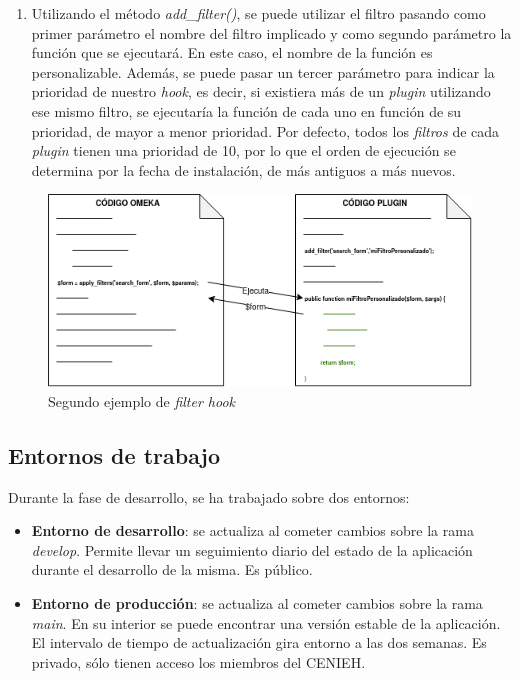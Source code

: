 \documentclass[
]{article}
\providecommand{\tightlist}{%
  \setlength{\itemsep}{0pt}\setlength{\parskip}{0pt}}
\begin{document}
\begin{enumerate}
\def\labelenumi{\arabic{enumi}.}
\setcounter{enumi}{1}
\tightlist
\item
  Utilizando el método \emph{add\_filter()}, se puede utilizar el filtro
  pasando como primer parámetro el nombre del filtro implicado y como
  segundo parámetro la función que se ejecutará. En este caso, el nombre
  de la función es personalizable. Además, se puede pasar un tercer
  parámetro para indicar la prioridad de nuestro \emph{hook}, es decir,
  si existiera más de un \emph{plugin} utilizando ese mismo filtro, se
  ejecutaría la función de cada uno en función de su prioridad, de mayor
  a menor prioridad. Por defecto, todos los \emph{filtros} de cada
  \emph{plugin} tienen una prioridad de 10, por lo que el orden de
  ejecución se determina por la fecha de instalación, de más antiguos a
  más nuevos.
\end{enumerate}

\begin{figure}
\hypertarget{filterhooksB}{%
\centering
\includegraphics{../_static/images/filterhooksB.png}
\caption{Segundo ejemplo de \emph{filter hook}}\label{filterhooksB}
}
\end{figure}

\hypertarget{entornos-de-trabajo}{%
\subsection{Entornos de trabajo}\label{entornos-de-trabajo}}

Durante la fase de desarrollo, se ha trabajado sobre dos entornos:

\begin{itemize}
\tightlist
\item
  \textbf{Entorno de desarrollo}: se actualiza al cometer cambios sobre
  la rama \emph{develop}. Permite llevar un seguimiento diario del
  estado de la aplicación durante el desarrollo de la misma. Es público.
\item
  \textbf{Entorno de producción}: se actualiza al cometer cambios sobre
  la rama \emph{main}. En su interior se puede encontrar una versión
  estable de la aplicación. El intervalo de tiempo de actualización gira
  entorno a las dos semanas. Es privado, sólo tienen acceso los miembros
  del CENIEH.
\end{itemize}
\end{document}
